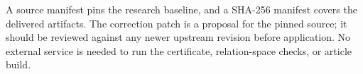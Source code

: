 A source manifest pins the research baseline, and a SHA-256 manifest
covers the delivered artifacts. The correction patch is a proposal
for the pinned source; it should be reviewed against any newer
upstream revision before application. No external service is needed
to run the certificate, relation-space checks, or article build.

